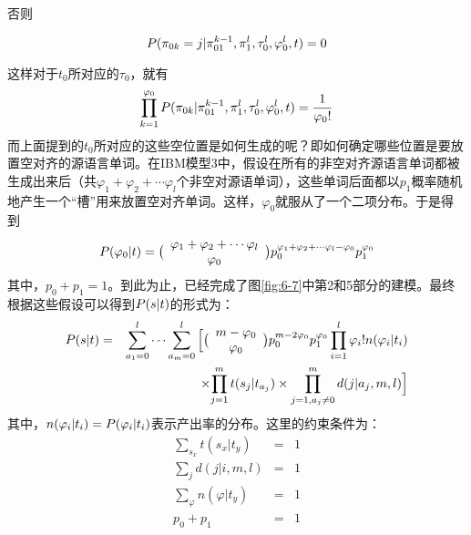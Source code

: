 否则

\begin{equation}
{P}(\pi_{0k}=j|\pi_{01}^{k-1},\pi_1^l,\tau_0^l,\varphi_0^l,{t})=0
\label{eq:6-14}
\end{equation}

这样对于$t_0$所对应的$\tau_0$，就有
{
\begin{eqnarray}
\prod_{k=1}^{\varphi_0}{{P}(\pi_{0k}|\pi_{01}^{k-1},\pi_{1}^{l},\tau_{0}^{l},\varphi_{0}^{l},{t})         }=\frac{1}{\varphi_{0}!}
\label{eq:6-15}
\end{eqnarray}
}
\parinterval 而上面提到的$t_0$所对应的这些空位置是如何生成的呢？即如何确定哪些位置是要放置空对齐的源语言单词。在IBM模型3中，假设在所有的非空对齐源语言单词都被生成出来后（共$\varphi_1+\varphi_2+\cdots {\varphi}_l$个非空对源语单词），这些单词后面都以$p_1$概率随机地产生一个“槽”用来放置空对齐单词。这样，${\varphi}_0$就服从了一个二项分布。于是得到
{
\begin{eqnarray}
{P}(\varphi_0|{t})=\big(\begin{array}{c}
\varphi_1+\varphi_2+\cdots \varphi_l\\
\varphi_0\\
\end{array}\big)p_0^{\varphi_1+\varphi_2+\cdots \varphi_l-\varphi_0}p_1^{\varphi_0}
\label{eq:6-16}
\end{eqnarray}
}
\noindent 其中，$p_0+p_1=1$。到此为止，已经完成了图\ref{fig:6-7}中第2和5部分的建模。最终根据这些假设可以得到${P}({s}| {t})$的形式为：
{
\begin{eqnarray}
{{P}({s}| {t})}&= &{\sum_{a_1=0}^{l}{\cdots}\sum_{a_m=0}^{l}{\Big[\big(\begin{array}{c}
m-\varphi_0\\
\varphi_0\\
\end{array}\big)}p_0^{m-2\varphi_0}p_1^{\varphi_0}\prod_{i=1}^{l}{{\varphi_i}!n(\varphi_i|t_i)    }} \nonumber \\
& & \times{\prod_{j=1}^{m}{t(s_j|t_{a_j})} \times \prod_{j=1,a_j\neq 0}^{m}{d(j|a_j,m,l)}} \Big]
\label{eq:6-17}
\end{eqnarray}
}
\noindent 其中，$n(\varphi_i |t_i)={{P}(\varphi_i|t_i)}$表示产出率的分布。这里的约束条件为：
{
\begin{eqnarray}
\sum_{s_x}t(s_x|t_y)                     & = &1 \label{eq:6-18} \\
\sum_{j}d(j|i,m,l)                & = & 1 \label{eq:6-19} \\
\sum_{\varphi} n(\varphi|t_y) & = &1 \label{eq:6-20} \\
p_0+p_1                            & = & 1 \label{eq:6-21}
\end{eqnarray}
}

